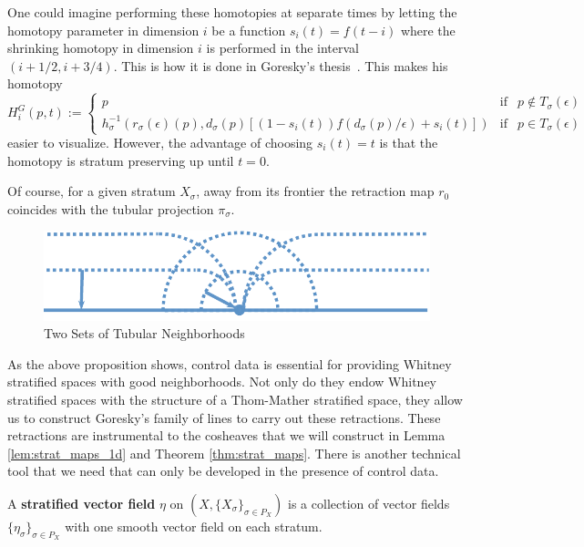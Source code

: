 \begin{rmk}
	One could imagine performing these homotopies at separate times by letting the homotopy parameter in dimension $i$ be a function $s_i(t)=f(t-i)$ where the shrinking homotopy in dimension $i$ is performed in the interval $(i+1/2,i+3/4)$. This is how it is done in Goresky's thesis~\cite{goresky-thesis}. This makes his homotopy
	\[
		H^G_{i}(p,t):=\left\{\begin{array}{lrl} 
		p & \mathrm{if} & p\notin T_{\sigma}(\epsilon) \\
		h_{\sigma}^{-1}(r_{\sigma}(\epsilon)(p),d_{\sigma}(p)[(1-s_i(t)) f(d_{\sigma}(p)/\epsilon) + s_i(t)]) & \mathrm{if} & p\in T_{\sigma}(\epsilon) \end{array}\right.
	\] 
	easier to visualize. However, the advantage of choosing $s_i(t)=t$ is that the homotopy is stratum preserving up until $t=0$.
\end{rmk}
\begin{rmk}
	Of course, for a given stratum $X_{\sigma}$, away from its frontier the retraction map $r_0$ coincides with the tubular projection $\pi_{\sigma}$.
\end{rmk}

\begin{figure}
	\centering
	\includegraphics[width=.9\textwidth]{reg_nbhd.pdf}
	\caption{Two Sets of Tubular Neighborhoods}
	\label{fig:reg_nbhd}
\end{figure}

As the above proposition shows, control data is essential for providing Whitney stratified spaces with good neighborhoods. Not only do they endow Whitney stratified spaces with the structure of a Thom-Mather stratified space, they allow us to construct Goresky's family of lines to carry out these retractions. These retractions are instrumental to the cosheaves that we will construct in Lemma \ref{lem:strat_maps_1d} and Theorem \ref{thm:strat_maps}. There is another technical tool that we need that can only be developed in the presence of control data.

\begin{defn}
A \textbf{stratified vector field} $\eta$ on $(X,\{X_{\sigma}\}_{\sigma\in P_X})$ is a collection of vector fields $\{\eta_{\sigma}\}_{\sigma\in P_X}$ with one smooth vector field on each stratum.
\end{defn}


